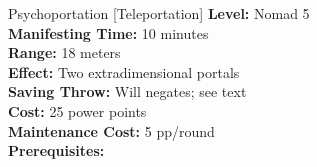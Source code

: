 {Psychoportation [Teleportation]}
{
	\textbf{Level:}
	Nomad 5\\
	\textbf{Manifesting Time:}
	10 minutes\\
	\textbf{Range:}
	18 meters\\
	\textbf{Effect:}
	Two extradimensional portals\\
	\textbf{Saving Throw:}
	Will negates; see text\\
	\textbf{Cost:}
	25 power points\\
	\textbf{Maintenance Cost:}
	5 pp/round\\
	\textbf{Prerequisites:}
	\\
}
